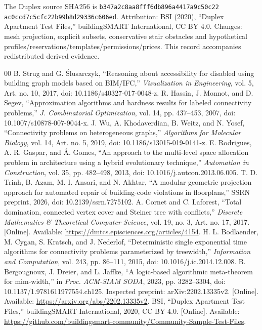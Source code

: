 \documentclass[conference]{IEEEtran}
\begin{document}
The Duplex source SHA256 is \texttt{b347a2c8aa8fff6db896a4417a9c50c22} \texttt{ac0ccd7c5cfc22b99b8d29336c606ed}. Attribution: BSI (2020), ``Duplex Apartment Test Files,'' buildingSMART International, CC BY 4.0. Changes: mesh projection, explicit subsets, conservative stair obstacles and hypothetical profiles/reservations/templates/permissions/prices. This record accompanies redistributed derived evidence.

\begin{thebibliography}{00}
 B. Strug and G. \'{S}lusarczyk, ``Reasoning about accessibility for disabled using building graph models based on BIM/IFC,'' \emph{Visualization in Engineering}, vol. 5, Art. no. 10, 2017, doi: 10.1186/s40327-017-0048-z.
 R. Hassin, J. Monnot, and D. Segev, ``Approximation algorithms and hardness results for labeled connectivity problems,'' \emph{J. Combinatorial Optimization}, vol. 14, pp. 437--453, 2007, doi: 10.1007/s10878-007-9044-x.
 J. Wu, A. Khodaverdian, B. Weitz, and N. Yosef, ``Connectivity problems on heterogeneous graphs,'' \emph{Algorithms for Molecular Biology}, vol. 14, Art. no. 5, 2019, doi: 10.1186/s13015-019-0141-z.
 E. Rodrigues, A. R. Gaspar, and \'{A}. Gomes, ``An approach to the multi-level space allocation problem in architecture using a hybrid evolutionary technique,'' \emph{Automation in Construction}, vol. 35, pp. 482--498, 2013, doi: 10.1016/j.autcon.2013.06.005.
 T. D. Trinh, B. Azam, M. I. Ansari, and N. Akhtar, ``A modular geometric projection approach for automated repair of building-code violations in floorplans,'' SSRN preprint, 2026, doi: 10.2139/ssrn.7275102.
 A. Cornet and C. Laforest, ``Total domination, connected vertex cover and Steiner tree with conflicts,'' \emph{Discrete Mathematics \& Theoretical Computer Science}, vol. 19, no. 3, Art. no. 17, 2017. [Online]. Available: \url{https://dmtcs.episciences.org/articles/4154}.
 H. L. Bodlaender, M. Cygan, S. Kratsch, and J. Nederlof, ``Deterministic single exponential time algorithms for connectivity problems parameterized by treewidth,'' \emph{Information and Computation}, vol. 243, pp. 86--111, 2015, doi: 10.1016/j.ic.2014.12.008.
 B. Bergougnoux, J. Dreier, and L. Jaffke, ``A logic-based algorithmic meta-theorem for mim-width,'' in \emph{Proc. ACM-SIAM SODA}, 2023, pp. 3282--3304, doi: 10.1137/1.9781611977554.ch125. Inspected preprint: arXiv:2202.13335v2. [Online]. Available: \url{https://arxiv.org/abs/2202.13335v2}.
 BSI, ``Duplex Apartment Test Files,'' buildingSMART International, 2020, CC BY 4.0. [Online]. Available: \url{https://github.com/buildingsmart-community/Community-Sample-Test-Files}.


\end{thebibliography}
\end{document}
